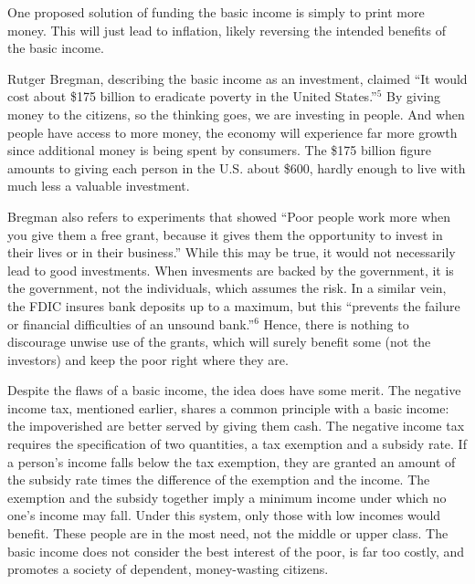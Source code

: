 \documentclass[12pt]{article}
\begin{document}
One proposed solution of funding the basic income is simply to print more money. This will just lead to inflation, likely reversing the intended benefits of the basic income.

Rutger Bregman, describing the basic income as an investment, claimed ``It would cost about \$175 billion to eradicate poverty in the United States.''$^5$ By giving money to the citizens, so the thinking goes, we are investing in people. And when people have access to more money, the economy will experience far more growth since additional money is being spent by consumers. The \$175 billion figure amounts to giving each person in the U.S. about \$600, hardly enough to live with much less a valuable investment.

Bregman also refers to experiments that showed ``Poor people work more when you give them a free grant, because it gives them the opportunity to invest in their lives or in their business.'' While this may be true, it would not necessarily lead to good investments. When invesments are backed by the government, it is the government, not the individuals, which assumes the risk. In a similar vein, the FDIC insures bank deposits up to a maximum, but this ``prevents the failure or financial difficulties of an unsound bank.''$^6$ Hence, there is nothing to discourage unwise use of the grants, which will surely benefit some (not the investors) and keep the poor right where they are.

Despite the flaws of a basic income, the idea does have some merit. The negative income tax, mentioned earlier, shares a common principle with a basic income: the impoverished are better served by giving them cash. The negative income tax requires the specification of two quantities, a tax exemption and a subsidy rate. If a person's income falls below the tax exemption, they are granted an amount of the subsidy rate times the difference of the exemption and the income. The exemption and the subsidy together imply a minimum income under which no one's income may fall. Under this system, only those with low incomes would benefit. These people are in the most need, not the middle or upper class. The basic income does not consider the best interest of the poor, is far too costly, and promotes a society of dependent, money-wasting citizens.
\bigskip
\end{document}
